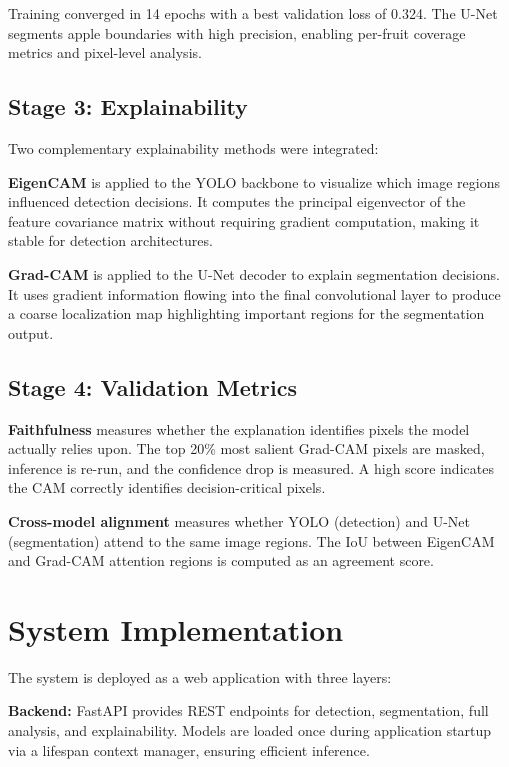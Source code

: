 \documentclass[12pt,a4paper]{article}
\begin{document}
Training converged in 14 epochs with a best validation loss of 0.324. The U-Net segments apple boundaries with high precision, enabling per-fruit coverage metrics and pixel-level analysis.

\subsection{Stage 3: Explainability}

Two complementary explainability methods were integrated:

\textbf{EigenCAM} is applied to the YOLO backbone to visualize which image regions influenced detection decisions. It computes the principal eigenvector of the feature covariance matrix without requiring gradient computation, making it stable for detection architectures.

\textbf{Grad-CAM} is applied to the U-Net decoder to explain segmentation decisions. It uses gradient information flowing into the final convolutional layer to produce a coarse localization map highlighting important regions for the segmentation output.

\subsection{Stage 4: Validation Metrics}

\textbf{Faithfulness} measures whether the explanation identifies pixels the model actually relies upon. The top 20\% most salient Grad-CAM pixels are masked, inference is re-run, and the confidence drop is measured. A high score indicates the CAM correctly identifies decision-critical pixels.

\textbf{Cross-model alignment} measures whether YOLO (detection) and U-Net (segmentation) attend to the same image regions. The IoU between EigenCAM and Grad-CAM attention regions is computed as an agreement score.

\section{System Implementation}

The system is deployed as a web application with three layers:

\textbf{Backend:} FastAPI provides REST endpoints for detection, segmentation, full analysis, and explainability. Models are loaded once during application startup via a lifespan context manager, ensuring efficient inference.
\end{document}
